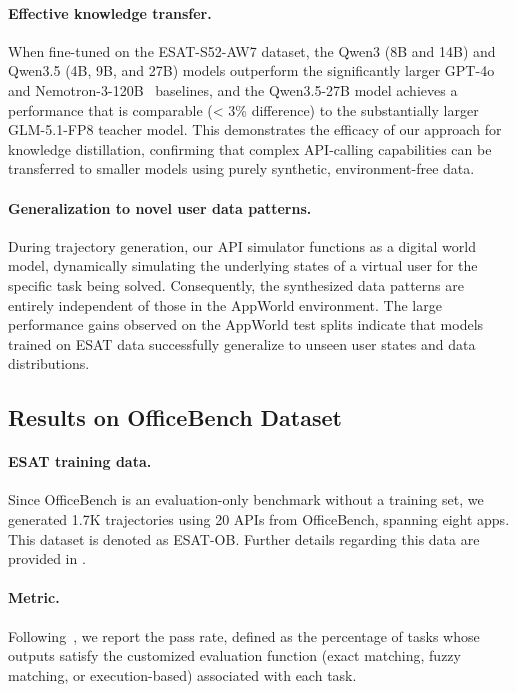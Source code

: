\paragraph{Effective knowledge transfer.} 
 When fine-tuned on the \textsc{ESAT}-S52-AW7 dataset, the Qwen3 (8B and 14B) and Qwen3.5 (4B, 9B, and 27B) models outperform the significantly larger GPT-4o~\citep{gpt-4o} and Nemotron-3-120B~\citep{chandiramani2026nemotron} baselines, and the Qwen3.5-27B model achieves a performance that is comparable (< 3\% difference) to the substantially larger GLM-5.1-FP8 teacher model. This demonstrates the efficacy of our approach for knowledge distillation, confirming that complex API-calling capabilities can be transferred to smaller models using purely synthetic, environment-free data.

\paragraph{Generalization to novel user data patterns.} During trajectory generation, our API simulator functions as a digital world model, dynamically simulating the underlying states of a virtual user for the specific task being solved. Consequently, the synthesized data patterns are entirely independent of those in the AppWorld environment. The large performance gains observed on the AppWorld test splits indicate that models trained on \textsc{ESAT} data successfully generalize to unseen user states and data distributions.


\subsection{Results on OfficeBench Dataset}
\paragraph{\textsc{ESAT} training data.} Since OfficeBench is an evaluation-only benchmark without a training set, we generated 1.7K trajectories using 20 APIs from OfficeBench, spanning eight apps. This dataset is denoted as \textsc{ESAT}-OB. Further details regarding this data are provided in .

\paragraph{Metric.} Following~\citet{wang2024officebench}, we report the pass rate, defined as the percentage of tasks whose outputs satisfy the customized evaluation function (exact matching, fuzzy matching, or execution-based) associated with each task.


